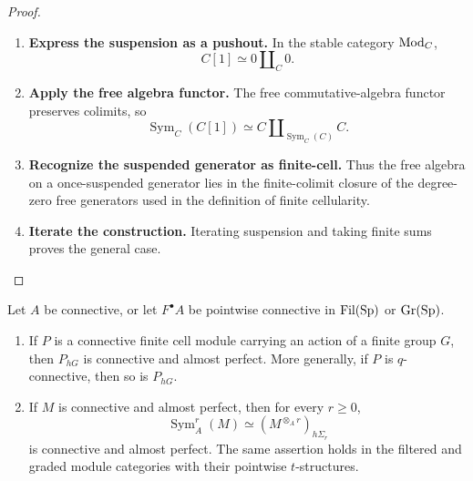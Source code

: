 \begin{proof}
\leavevmode
\begin{enumerate}[label=\textup{(\arabic*)}]
    \item \textbf{Express the suspension as a pushout.}
    In the stable category \(\operatorname{Mod}_C\),
    \[
        C[1]\simeq0\amalg_C0.
    \]
    \item \textbf{Apply the free algebra functor.}
    The free commutative-algebra functor preserves colimits, so
    \[
        \operatorname{Sym}_C(C[1])
        \simeq
        C\amalg_{\operatorname{Sym}_C(C)}C.
    \]
    \item \textbf{Recognize the suspended generator as finite-cell.}
    Thus the free algebra on a once-suspended generator lies in the finite-colimit
    closure of the degree-zero free generators used in the definition of finite
    cellularity.
    \item \textbf{Iterate the construction.}
    Iterating suspension and taking finite sums proves the general
    case.
\end{enumerate}
\end{proof}


\begin{lemma}
\label{lem:finite-group-orbits-almost-perfect}
Let \(A\) be connective, or let \(F^\bullet A\) be pointwise connective in
\(\operatorname{Fil}(\operatorname{Sp})\) or \(\operatorname{Gr}(\operatorname{Sp})\).
\begin{enumerate}[label=(\roman*)]
    \item If \(P\) is a connective finite cell module carrying an action of a
    finite group \(G\), then \(P_{hG}\) is connective and almost perfect.
    More generally, if \(P\) is \(q\)-connective, then so is \(P_{hG}\).
    \item If \(M\) is connective and almost perfect, then for every
    \(r\geq0\),
    \[
        \operatorname{Sym}^r_A(M)
        \simeq
        (M^{\otimes_A r})_{h\Sigma_r}
    \]
    is connective and almost perfect. The same assertion holds in the
    filtered and graded module categories with their pointwise
    \(t\)-structures.
\end{enumerate}
\end{lemma}

